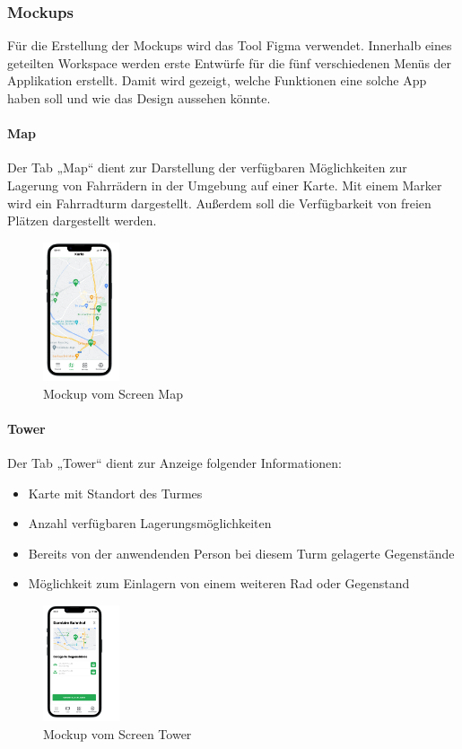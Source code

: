 \subsubsection{Mockups}
Für die Erstellung der Mockups wird das Tool Figma verwendet. Innerhalb eines geteilten Workspace werden erste Entwürfe für die fünf verschiedenen Menüs der Applikation erstellt. Damit wird gezeigt, welche Funktionen eine solche App haben soll und wie das Design aussehen könnte.\\

\paragraph{Map}Der Tab „Map“ dient zur Darstellung der verfügbaren Möglichkeiten zur Lagerung von Fahrrädern in der Umgebung auf einer Karte. Mit einem Marker wird ein Fahrradturm dargestellt. Außerdem soll die Verfügbarkeit von freien Plätzen dargestellt werden.\\
\begin{figure}[H]
  \centering
  \includegraphics[width=0.2\textwidth]{images/app_mock_map}
  \caption{Mockup vom Screen Map}
  \label{fig:screenmap}
\end{figure}

\paragraph{Tower}Der Tab „Tower“ dient zur Anzeige folgender Informationen:\\
\begin{itemize}
  \item Karte mit Standort des Turmes
  \item Anzahl verfügbaren Lagerungsmöglichkeiten
  \item Bereits von der anwendenden Person bei diesem Turm gelagerte Gegenstände 
  \item Möglichkeit zum Einlagern von einem weiteren Rad oder Gegenstand
\end{itemize}
\begin{figure}[H]
  \centering
  \includegraphics[width=0.2\textwidth]{images/app_mock_tower}
  \caption{Mockup vom Screen Tower}
  \label{fig:screentower}
\end{figure}

